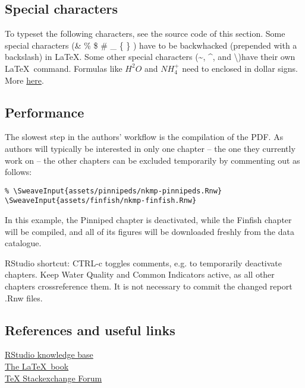\subsection*{Special characters}
To typeset the following characters, see the source code of this section.
Some special characters (\& \% \$ \# \_ \{ \} \@) have to be backwhacked
(prepended with a backslash) in \LaTeX. Some other special characters (\textasciitilde,
\textasciicircum, and \textbackslash)have their own \LaTeX\ command.
Formulas like $H^{2}O$ and $NH_{4}^{+}$ need to enclosed in dollar signs.
More \href{http://en.wikibooks.org/wiki/LaTeX/Mathematics}{here}.

\subsection*{Performance}
The slowest step in the authors' workflow is the compilation of the PDF.
As authors will typically be interested in only one chapter -- the one they currently work on --
the other chapters can be excluded temporarily by commenting out as follows:

{\small\begin{verbatim}
% \SweaveInput{assets/pinnipeds/nkmp-pinnipeds.Rnw}
\SweaveInput{assets/finfish/nkmp-finfish.Rnw}
\end{verbatim}}

In this example, the Pinniped chapter is deactivated, while the Finfish chapter
will be compiled, and all of its figures will be downloaded freshly from the
data catalogue.

\begin{remark}
RStudio shortcut: CTRL-c toggles comments, e.g. to temporarily deactivate chapters.
Keep Water Quality and Common Indicators active, as all other chapters crossreference them.
It is not necessary to commit the changed report .Rnw files.
\end{remark}


\subsection*{References and useful links}
\href{https://support.rstudio.com/hc/en-us}{RStudio knowledge base}\\
\href{http://en.wikibooks.org/wiki/LaTeX}{The \LaTeX\ book}\\
\href{http://tex.stackexchange.com/}{TeX Stackexchange Forum}\\
